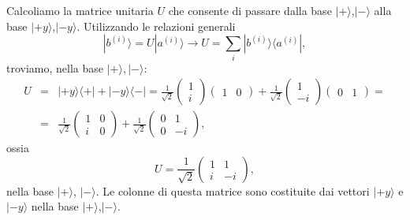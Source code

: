 Calcoliamo la matrice unitaria $U$ che consente di passare dalla base $| + \rangle $,$| - \rangle $ alla base $| +y \rangle $,$| -y \rangle$. Utilizzando le relazioni generali
		\begin{equation}
		\boxed{
			| b^{(i)}\rangle =U| a^{(i)} \rangle \rightarrow U = \sum \limits_i | b^{(i)}\rangle \langle a^{(i)}| ,
			}
	\end{equation}
troviamo, nella base $| + \rangle,| - \rangle$:
	\begin{eqnarray}
		U &=& | +y \rangle \langle + | + |-y \rangle \langle - |=
		\frac{1}{\sqrt{2}}
		\begin{pmatrix}
		1\\
		i
		\end{pmatrix}
		\begin{pmatrix}
		1 & 0
		\end{pmatrix}+
		\frac{1}{\sqrt{2}}
		\begin{pmatrix}
		1\\
		-i
		\end{pmatrix}
		\begin{pmatrix}
		0 & 1
		\end{pmatrix}= \nonumber \\
		&=&\frac{1}{\sqrt{2}}
		\begin{pmatrix}
		1 & 0\\
		i & 0
		\end{pmatrix}+
		\frac{1}{\sqrt{2}}
		\begin{pmatrix}
		0 & 1\\
		0 & -i
		\end{pmatrix} ,
	\end{eqnarray}
ossia
	\begin{equation}
		\boxed{
			U= \frac{1}{\sqrt{2}}
			\begin{pmatrix}
			1 & 1\\
			i & -i
			\end{pmatrix} ,
			}
	\end{equation}
nella base $| + \rangle $, $| - \rangle $. Le colonne di questa matrice sono costituite dai vettori $| +y \rangle $ e $| -y \rangle $ nella base $| + \rangle $,$| - \rangle $.\\

